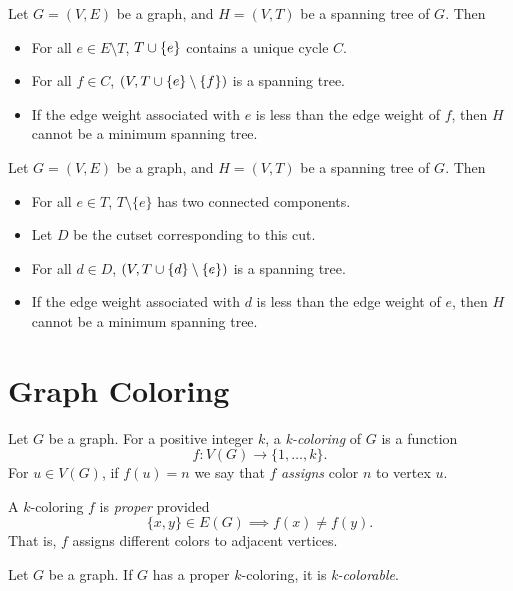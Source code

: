 \begin{prop}
    Let $G = (V, E)$ be a graph, and $H = (V, T)$ be a spanning tree of $G$. Then
    \begin{itemize}
        \item For all $e \in E \setminus T$, $T \cup \{e\}$ contains a unique cycle $C$.
        \item For all $f \in C$, $(V, T \cup \{e\} \setminus \{f\})$ is a spanning tree.
        \item If the edge weight associated with $e$ is less than the edge weight of $f$, then $H$ cannot be a minimum spanning tree.
    \end{itemize}
\end{prop}

\begin{prop}
    Let $G = (V, E)$ be a graph, and $H = (V, T)$ be a spanning tree of $G$. Then
    \begin{itemize}
        \item For all $e \in T$, $T \setminus \{e\}$ has two connected components.
        \item Let $D$ be the cutset corresponding to this cut.
        \item For all $d \in D$, $(V, T \cup \{d\} \setminus \{e\})$ is a spanning tree.
        \item If the edge weight associated with $d$ is less than the edge weight of $e$, then $H$ cannot be a minimum spanning tree.
    \end{itemize}
\end{prop}

\section{Graph Coloring}

\begin{defn}
    Let $G$ be a graph. For a positive integer $k$, a \emph{k-coloring} of $G$ is a function
    \[f: V(G) \to \{1, \ldots, k\}.\] For $u \in V(G)$, if $f(u) = n$ we say that $f$ \emph{assigns} color $n$ to vertex $u$.
\end{defn}

\begin{defn}
    A $k$-coloring $f$ is \emph{proper} provided
    \[\{x, y\} \in E(G) \implies f(x) \neq f(y).\]
    That is, $f$ assigns different colors to adjacent vertices.
\end{defn}

\begin{defn}
    Let $G$ be a graph. If $G$ has a proper $k$-coloring, it is \emph{k-colorable}.
\end{defn}

